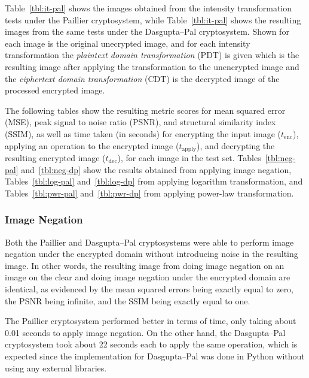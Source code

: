 Table~\ref{tbl:it-pal} shows the images obtained from the intensity transformation tests under the Paillier cryptosystem, while Table~\ref{tbl:it-pal} shows the resulting images from the same tests under the Dasgupta--Pal cryptosystem. Shown for each image is the original unecrypted image, and for each intensity transformation the \textit{plaintext domain transformation} (PDT) is given which is the resulting image after applying the transformation to the unencrypted image and the \textit{ciphertext domain transformation} (CDT) is the decrypted image of the processed encrypted image.

The following tables show the resulting metric scores for mean squared error (MSE), peak signal to noise ratio (PSNR), and structural similarity index (SSIM), as well as time taken (in seconds) for encrypting the input image ($t_\text{enc}$), applying an operation to the encrypted image ($t_\text{apply}$), and decrypting the resulting encrypted image ($t_\text{dec}$), for each image in the test set. Tables~\ref{tbl:neg-pal} and~\ref{tbl:neg-dp} show the results obtained from applying image negation, Tables~\ref{tbl:log-pal} and~\ref{tbl:log-dp} from applying logarithm transformation, and Tables~\ref{tbl:pwr-pal} and~\ref{tbl:pwr-dp} from applying power-law transformation.

\subsubsection{Image Negation}
Both the Paillier and Dasgupta--Pal cryptosystems were able to perform image negation under the encrypted domain without introducing noise in the resulting image. In other words, the resulting image from doing image negation on an image on the clear and doing image negation under the encrypted domain are identical, as evidenced by the mean squared errors being exactly equal to zero, the PSNR being infinite, and the SSIM being exactly equal to one.

The Paillier cryptosystem performed better in terms of time, only taking about 0.01 seconds to apply image negation. On the other hand, the Dasgupta--Pal cryptosystem took about 22 seconds each to apply the same operation, which is expected since the implementation for Dasgupta--Pal was done in Python without using any external libraries.

